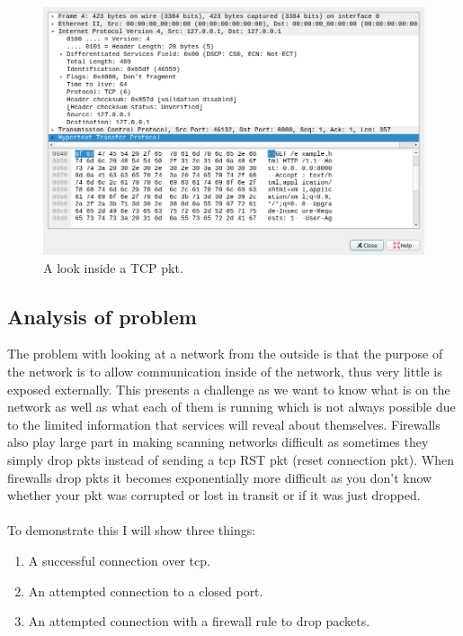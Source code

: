 \documentclass[titlepage]{article}
\let\Oldsubsection\subsection{}
\renewcommand{\subsection}{\FloatBarrier\Oldsubsection}
\begin{document}
\begin{figure}[H]
  \centering
  \includegraphics[width=\textwidth]{screenshots/deconstructed_packet.png}
  \caption{%
    A look inside a TCP \gls{pkt}.
  }\label{deconstructed}
\end{figure}

\lstset{language=HTML}


\subsection{Analysis of problem}

The problem with looking at a network from the outside is that the purpose of the network is to 
allow communication inside of the network, thus very little is exposed externally. This presents a 
challenge as we want to know what is on the network as well as what each of them is running which is 
not always possible due to the limited information that \glspl{service} will reveal about 
themselves. Firewalls also play large part in making scanning networks difficult as sometimes they 
simply drop \glspl{pkt} instead of sending a \gls{tcp} RST \gls{pkt} (reset connection \gls{pkt}). 
When firewalls drop \glspl{pkt} it becomes exponentially more difficult as you don't know whether 
your \gls{pkt} was corrupted or lost in transit or if it was just dropped. \\\\ To demonstrate this 
I will show three things:

\begin{enumerate}
  \item{A successful connection over \gls{tcp}.}
  \item{An attempted connection to a closed port.}
  \item{An attempted connection with a firewall rule to drop packets.}
\end{enumerate}
\end{document}
